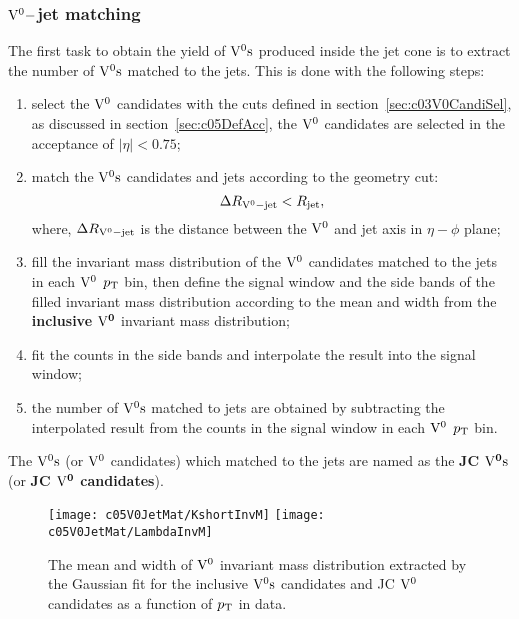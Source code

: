 \subsubsection{${\rm V}^{0}-$jet matching}
\label{sec:c05V0JetMat}

The first task to obtain the yield of ${\rm V}^{0}{\rm s}$ produced inside the jet cone
is to extract the number of ${\rm V}^{0}{\rm s}$ matched to the jets.
This is done with the following steps:
\begin{enumerate}
\item select the ${\rm V}^{0}$ candidates with the cuts defined
      in section~\ref{sec:c03V0CandiSel},
      as discussed in section~\ref{sec:c05DefAcc},
      the ${\rm V}^{0}$ candidates are selected in the acceptance of $|\eta|<0.75$;
\item match the ${\rm V}^{0}{\rm s}$ candidates and jets according to the geometry cut:
      \begin{equation}\label{eq:c05V0JetMatch}
      \Delta R_{{\rm V}^{0}-{\rm jet}}<R_{\rm jet},
      \end{equation}
      where, $\Delta R_{{\rm V}^{0}-{\rm jet}}$ is the distance between
      the ${\rm V}^{0}$ and jet axis in $\eta-\phi$ plane;
\item fill the invariant mass distribution of the ${\rm V}^{0}$ candidates
      matched to the jets in each ${\rm V}^{0}$ $p_{\rm T}$ bin, then define the signal
      window and the side bands of the filled invariant mass distribution
      according to the mean and width from the {\bf inclusive $\mathbf{{\rm V}^{0}}$}
      invariant mass distribution;
\item fit the counts in the side bands and interpolate the result into the
      signal window;
\item the number of ${\rm V}^{0}{\rm s}$ matched to jets are obtained by subtracting
      the interpolated result from the counts in the signal window
      in each ${\rm V}^{0}$ $p_{\rm T}$ bin.
\end{enumerate}
The ${\rm V}^{0}{\rm s}$ (or ${\rm V}^{0}$ candidates) which matched to the jets are named as
the {\bf JC $\mathbf{{\rm V}^{0}{\rm s}}$} (or {\bf JC $\mathbf{{\rm V}^{0}}$ candidates}).

\begin{figure}[htb]
\begin{center}
\texttt{[image: c05V0JetMat/KshortInvM]}
\texttt{[image: c05V0JetMat/LambdaInvM]}
\caption{The mean and width of ${\rm V}^{0}$ invariant mass distribution extracted
         by the Gaussian fit for the inclusive ${\rm V}^{0}{\rm s}$ candidates
         and JC ${\rm V}^{0}$ candidates as a function of $p_{\rm T}$ in data.}
\label{fig:c05CompV0FitInvM}
\end{center}
\end{figure}

